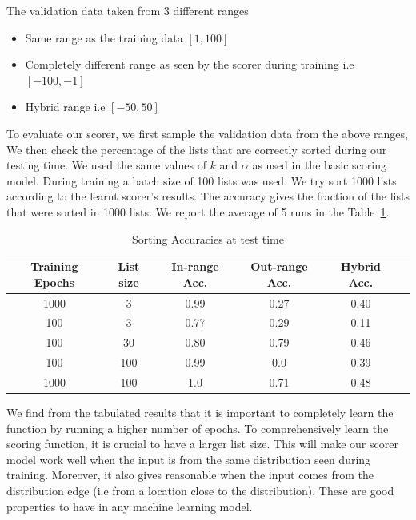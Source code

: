 \documentclass[12pt, twoside, ngerman]{report}
\begin{document}

The validation data taken from 3 different ranges
\begin{itemize}
\item Same range as the training data $[1, 100]$
\item Completely different range as seen by the scorer during training i.e $[-100, -1]$
\item Hybrid range i.e $[-50, 50]$
\end{itemize} 

To evaluate our scorer,  we first sample the validation data from the above ranges,
We then check the percentage of the lists that are correctly sorted during our testing time.
We used the same values of $k$ and $\alpha$ as used in the basic scoring model.
During training a batch size of 100 lists was used.
We try sort 1000 lists according to the learnt scorer's results.
The accuracy gives the fraction of the lists that were sorted in 1000 lists.
We report the average of 5 runs in the Table~\ref{table:caseStudyResults}.

\begin{table} [h!]
\centering
\resizebox{\linewidth}{!} {
\begin{tabular}{ | c | c | c | c | c | c | }
\hline
\textbf{Training Epochs} & \textbf{List size} & \textbf{In-range Acc.} & \textbf{Out-range Acc.} & \textbf{Hybrid Acc.} \\ [0.5 ex]
\hline \hline
1000 & 3 & 0.99 & 0.27 & 0.40\\
100 & 3  & 0.77 & 0.29 & 0.11\\
100 & 30  & 0.80 & 0.79 & 0.46\\
100 & 100  & 0.99 & 0.0 & 0.39\\
1000 & 100  & 1.0 & 0.71 & 0.48\\
\hline
\end{tabular}
}
\caption{Sorting Accuracies at test time}
\label {table:caseStudyResults}
\end{table}

We find from the tabulated results that it is important to completely learn the function by running a higher number of epochs.
To comprehensively learn the scoring function,  it is crucial to have a larger list size.
This will make our scorer model work well when the input is from the same distribution seen during training.
Moreover,  it also gives reasonable when the input comes from the distribution edge (i.e from a location close to the distribution).
These are good properties to have in any machine learning model.
\end{document}
